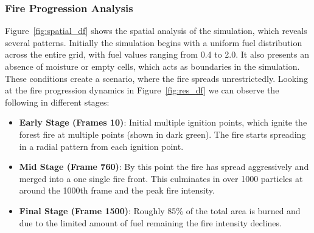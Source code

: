 \subsubsection{Fire Progression Analysis}
Figure~\ref{fig:spatial_df} shows the spatial analysis of the simulation, which reveals several patterns.
Initially the simulation begins with a uniform fuel distribution across the entire grid, with fuel values ranging from 0.4 to 2.0. It also presents an absence of moisture or empty cells, which acts as boundaries in the simulation. These conditions create a scenario, where the fire spreads unrestrictedly. Looking at the fire progression dynamics in Figure~\ref{fig:res_df} we can observe the following in different stages:
\begin{itemize}
	\item \textbf{Early Stage (Frames 10)}: Initial multiple ignition points, which ignite the forest fire at multiple points (shown in dark green). The fire starts spreading in a radial pattern from each ignition point.
	\item \textbf{Mid Stage (Frame 760)}: By this point the fire has spread aggressively and merged into a one single fire front. This culminates in over 1000 particles at around the 1000th frame and the peak fire intensity.
	\item \textbf{Final Stage (Frame 1500)}: Roughly 85\% of the total area is burned and due to the limited amount of fuel remaining the fire intensity declines.
\end{itemize}

